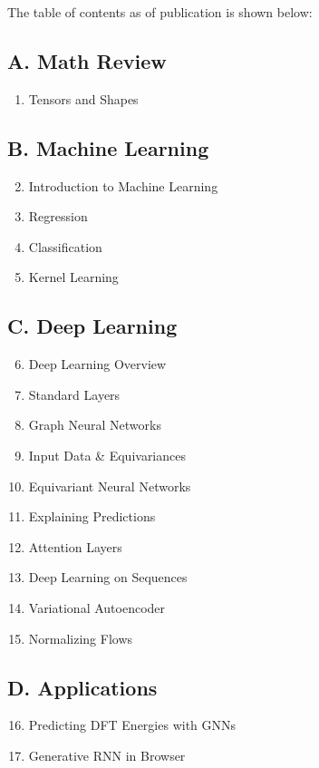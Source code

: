 \documentclass[9pt,pubversion,training]{livecoms}
\begin{document}
The table of contents as of publication is shown below:

\subsection*{A. Math Review}
\begin{enumerate}
    \item Tensors and Shapes
\end{enumerate}

\subsection*{B. Machine Learning}
    \begin{enumerate}
        \setcounter{enumi}{1}
    \item Introduction to Machine Learning
    \item Regression
    \item Classification
    \item Kernel Learning
    \end{enumerate}
    \subsection*{C. Deep Learning}
    \begin{enumerate}
                \setcounter{enumi}{5}
    \item Deep Learning Overview
    \item Standard Layers
    \item Graph Neural Networks
    \item Input Data \& Equivariances
    \item Equivariant Neural Networks
    \item Explaining Predictions
    \item Attention Layers
    \item Deep Learning on Sequences
    \item Variational Autoencoder
    \item Normalizing Flows
    \end{enumerate}
    \subsection*{D. Applications}
    \begin{enumerate}
                \setcounter{enumi}{15}
    \item Predicting DFT Energies with GNNs
    \item Generative RNN in Browser
\end{enumerate}
\end{document}
